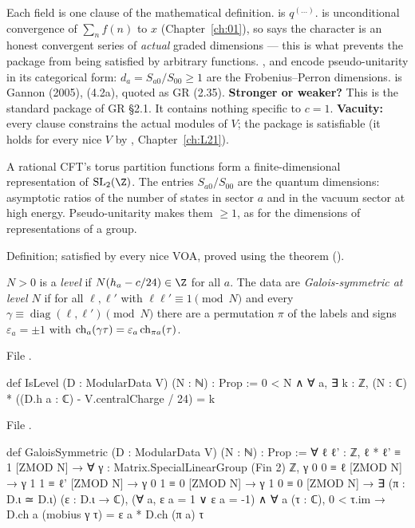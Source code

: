 \begin{dictionary}
Each field is one clause of the mathematical definition.  is
$q^{(\dots)}$.  is unconditional convergence of $\sum_n f(n)$ to $x$ (Chapter~\ref{ch:01}),
so  says the character is an honest convergent series of \emph{actual} graded dimensions --- this
is what prevents the package from being satisfied by arbitrary functions. ,
 and  encode pseudo-unitarity in its categorical form: $d_a=S_{a0}/S_{00}\ge1$
are the Frobenius--Perron dimensions.  is Gannon (2005), (4.2a), quoted as GR (2.35).
\textbf{Stronger or weaker?} This is the standard package of GR §2.1. It contains nothing specific to $c=1$.
\textbf{Vacuity:} every clause constrains the actual modules of $V$; the package is satisfiable (it holds for
every nice $V$ by , Chapter~\ref{ch:L21}).
\end{dictionary}

\begin{physics}
A rational CFT's torus partition functions form a finite-dimensional representation of $\ltwotwoSL$. The
entries $S_{a0}/S_{00}$ are the quantum dimensions: asymptotic ratios of the number of states in sector $a$ and
in the vacuum sector at high energy. Pseudo-unitarity makes them $\ge1$, as for the dimensions of
representations of a group.
\end{physics}

\begin{status}
Definition; satisfied by every nice VOA, proved using the theorem  ().
\end{status}

\begin{definition}\label{l22:def:level}
$N>0$ is a \emph{level} if $N(h_a-c/24)\in\Z$ for all $a$. The data are \emph{Galois-symmetric at level $N$}
if for all $\ell,\ell'$ with $\ell\ell'\equiv1\pmod N$ and every $\gamma\equiv\operatorname{diag}(\ell,\ell')
\pmod N$ there are a permutation $\pi$ of the labels and signs $\varepsilon_a=\pm1$ with
$\operatorname{ch}_a(\gamma\tau)=\varepsilon_a\operatorname{ch}_{\pi a}(\tau)$.
\end{definition}
\noindent File .
\begin{leancode}
def IsLevel (D : ModularData V) (N : ℕ) : Prop :=
  0 < N ∧ ∀ a, ∃ k : ℤ, (N : ℂ) * ((D.h a : ℂ) - V.centralCharge / 24) = k
\end{leancode}
\noindent File .
\begin{leancode}
def GaloisSymmetric (D : ModularData V) (N : ℕ) : Prop :=
  ∀ ℓ ℓ' : ℤ, ℓ * ℓ' ≡ 1 [ZMOD N] → ∀ γ : Matrix.SpecialLinearGroup (Fin 2) ℤ,
    γ 0 0 ≡ ℓ [ZMOD N] → γ 1 1 ≡ ℓ' [ZMOD N] → γ 0 1 ≡ 0 [ZMOD N] → γ 1 0 ≡ 0 [ZMOD N] →
    ∃ (π : D.ι ≃ D.ι) (ε : D.ι → ℂ), (∀ a, ε a = 1 ∨ ε a = -1) ∧
      ∀ a (τ : ℂ), 0 < τ.im → D.ch a (mobius γ τ) = ε a * D.ch (π a) τ
\end{leancode}

